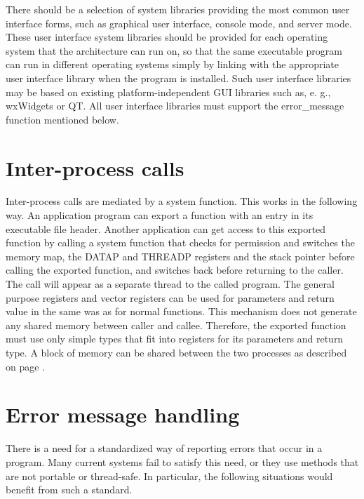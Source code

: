 \documentclass[forwardcom.tex]{subfiles}
\begin{document}
There should be a selection of system libraries providing the most common user interface forms, such as graphical user interface, console mode, and server mode. These user interface system libraries should be provided for each operating system that the architecture can run on, so that the same executable program can run in different operating systems simply by linking with the appropriate user interface library when the program is installed. Such user interface libraries may be based on existing platform-independent GUI libraries such as, e. g., wxWidgets or QT. All user interface libraries must support the error\_message function mentioned below. 

\section{Inter-process calls} \label{interProcessCalls}
Inter-process calls are mediated by a system function. This works in the following way. An application program can export a function with an entry in its executable file header. Another application can get access to this exported function by calling a system function that checks for permission and switches the memory map, the DATAP and THREADP registers and the stack pointer before calling the exported function, and switches back before returning to the caller. The call will appear as a separate thread to the called program. The general purpose registers and vector registers can be used for parameters and return value in the same was as for normal functions. This mechanism does not generate any shared memory between caller and callee. Therefore, the exported function must use only simple types that fit into registers for its parameters and return type. A block of memory can be shared between the two processes as described on page \pageref{sharedMemory}. 


\section{Error message handling} \label{errorMessageHandling}
There is a need for a standardized way of reporting errors that occur in a program. Many current systems fail to satisfy this need, or they use methods that are not portable or thread-safe. In particular, the following situations would benefit from such a standard. 
\end{document}
